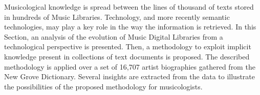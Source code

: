 Musicological knowledge is spread between the lines of thousand of texts stored in hundreds of Music Libraries. Technology, and more recently semantic technologies, may play a key role in the way the information is retrieved. In this Section, an analysis of the evolution of Music Digital Libraries from a technological perspective is presented. Then, a methodology to exploit implicit knowledge present in collections of text documents is proposed. The described methodology is applied over a set of 16,707 artist biographies gathered from the New Grove Dictionary. %
Several insights are extracted from the data to illustrate the possibilities of the proposed methodology for musicologists.



